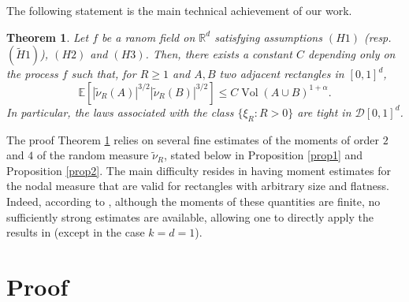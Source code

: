 \documentclass[11pt,a4paper]{article}
\newcommand\R{\mathbb{R}}
\newcommand\Dd{\mathcal{D}}
\newcommand\E{\mathbb{E}}
\newcommand\nut{\tilde{\nu}}
\DeclareMathOperator\Vol{Vol}
\numberwithin{equation}{section}
\theoremstyle{plain}
\newtheorem{theo}{Theorem}[section]
\newenvironment{theorem}%
  {\begin{mdframed}[backgroundcolor=white]\begin{theo}}%
  {\end{theo}\par\vspace{0.1cm}\end{mdframed}}
\theoremstyle{plain}
\theoremstyle{plain}
\theoremstyle{plain}
\theoremstyle{definition}
\theoremstyle{definition}
\begin{document}
The following statement is the main technical achievement of our work.
\begin{theorem}
\label{thm2}
Let $f$ be a ranom field on $\R^d$ satisfying assumptions $(H1)$ (resp. $(\widetilde{H}1)$), $(H2)$ and $(H3)$. Then, there exists a constant $C$ depending only on the process $f$ such that, for $R\geq 1$ and $A,B$ two adjacent rectangles in $[0,1]^d$,
\[\E[|\nut_R(A)|^{3/2}|\nut_R(B)|^{3/2}]\leq C \Vol(A\cup B)^{1+\alpha}.\]
In particular, the laws associated with the class $\{ \xi_R: R>0\}$ are tight in $\Dd[0,1]^d$.
\end{theorem}
The proof Theorem \ref{thm2} relies on several fine estimates of the moments of order $2$ and $4$ of the random measure $\nut_R$, stated below in Proposition \ref{prop1} and Proposition \ref{prop2}. The main difficulty resides in having moment estimates for the nodal measure that are valid for rectangles with arbitrary size and flatness. Indeed, according to \cite{Gas23}, although the moments of these quantities are finite, no sufficiently strong estimates are available, allowing one to directly apply the results in \cite{Iva82} (except in the case $k=d=1$).
\section{Proof}
\end{document}
